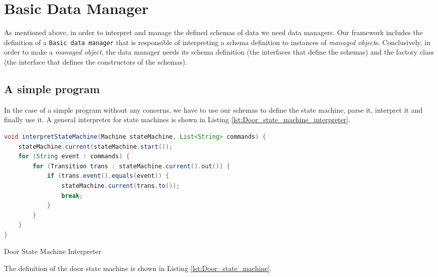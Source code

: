 \section{Basic Data Manager}
As mentioned above, in order to interpret and manage the defined schemas of data we need data managers. 
Our framework includes the definition of a \texttt{Basic data manager} that is responsible of interpreting a schema definition to instances of \textit{managed object}s.
Conclusively, in order to make a \textit{managed object}, the data manager needs its schema definition (the interfaces that define the schemas) and the factory class (the interface that defines the constructors of the schemas).

\subsection{A simple program}
In the case of a simple program without any concerns, we have to use our schemas to define the state machine, parse it, interpret it and finally use it. A general interpreter for state machines is shown in Listing \ref{lst:Door_state_machine_interpreter}.

\begin{sourcecode} [H]
	\begin{lstlisting}[language=Java, escapechar=|]
void interpretStateMachine(Machine stateMachine, List<String> commands) {
	stateMachine.current(stateMachine.start());
	for (String event : commands) {
		for (Transition trans : stateMachine.current().out()) {
			if (trans.event().equals(event)) {
				stateMachine.current(trans.to());
				break;
			}
		}
	}
}
	\end{lstlisting}
	\caption{Door State Machine Interpreter}
	\label{lst:Door_state_machine_interpreter}
\end{sourcecode}

The definition of the door state machine is shown in Listing \ref{lst:Door_state_machine}.

